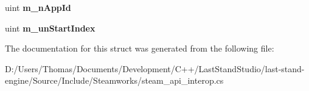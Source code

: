 \begin{DoxyCompactItemize}
\item 
\hypertarget{structValve_1_1Steamworks_1_1RemoteStorageEnumerateWorkshopFilesResult__t_a9705fefba8100eae767d095b8271add0}{}uint {\bfseries m\+\_\+n\+App\+Id}\label{structValve_1_1Steamworks_1_1RemoteStorageEnumerateWorkshopFilesResult__t_a9705fefba8100eae767d095b8271add0}

\item 
\hypertarget{structValve_1_1Steamworks_1_1RemoteStorageEnumerateWorkshopFilesResult__t_aa501310997ab67af816585fc296b1d44}{}uint {\bfseries m\+\_\+un\+Start\+Index}\label{structValve_1_1Steamworks_1_1RemoteStorageEnumerateWorkshopFilesResult__t_aa501310997ab67af816585fc296b1d44}

\end{DoxyCompactItemize}


The documentation for this struct was generated from the following file\+:\begin{DoxyCompactItemize}
\item 
D\+:/\+Users/\+Thomas/\+Documents/\+Development/\+C++/\+Last\+Stand\+Studio/last-\/stand-\/engine/\+Source/\+Include/\+Steamworks/steam\+\_\+api\+\_\+interop.\+cs\end{DoxyCompactItemize}
